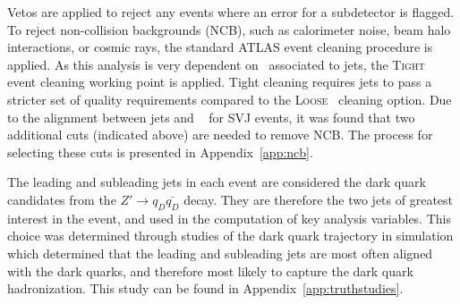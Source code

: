 Vetos are applied to reject any events where an error for a subdetector is flagged. 
To reject non-collision backgrounds (NCB), such as calorimeter noise, beam halo interactions, or cosmic rays, the standard ATLAS event cleaning procedure is applied.
As this analysis is very dependent on \met~associated to jets, the \textsc{Tight}~\cite{tight_loose} event cleaning working point is applied. 
Tight cleaning requires jets to pass a stricter set of quality requirements compared to the \textsc{Loose}~\cite{tight_loose} cleaning option.
Due to the alignment between jets and \met~ for SVJ events, it was found that two additional cuts (indicated above) are needed to remove NCB.
The process for selecting these cuts is presented in Appendix~\ref{app:ncb}. 

The leading and subleading jets in each event are considered the dark quark candidates from the $Z' \rightarrow q_D\bar{q_D}$ decay.  
They are therefore the two jets of greatest interest in the event, and used in the computation of key analysis variables.
This choice was determined through studies of the dark quark trajectory in simulation which determined that the leading and subleading jets are most often aligned with the dark quarks, and therefore most likely to capture the dark quark hadronization.
This study can be found in Appendix~\ref{app:truthstudies}.

